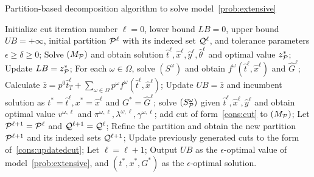 \documentclass[11pt]{article}
\newcommand{\cQ}{{\cal Q}}
\newcommand{\cP}{{\cal P}}
\newcommand{\tcr}{\textcolor{red}}
\begin{document}
	\begin{algorithm}[ht]
		\caption{Partition-based decomposition algorithm to solve model~\eqref{prob:extensive}}
		\label{alg:Cut}
		\begin{algorithmic}[1]
			\State Initialize cut iteration number \(\ell = 0\), lower bound \(LB = 0\), upper bound \(UB = +\infty\), initial partition \(\cP^\ell\) with its indexed set \(\cQ^\ell\), and tolerance parameters \( \epsilon \ge \delta \ge 0\);
			 \label{alg:while_step}
			\State Solve \((M_{\cP})\) and obtain solution \(\hat{t}^{\ell}, \hat{x}^{\ell}, \hat{y}^{\ell}, \hat{\theta}^{\ell}\) and optimal value \(z_{\cP}^*\);
			\If{\(z_{\cP}^* > LB\)}
			\State Update \(LB = z_{\cP}^*\);
			\EndIf
			\State For each \(\omega \in \Omega\), solve \((S^\omega)\) and obtain \(f^{\omega}(\hat{t}^{\ell},\hat{x}^{\ell})\) and \(\hat{G}^\ell\); 
			\State Calculate \(\bar{z} = p^0 \hat{t}^\ell_T + \sum_{\omega \in \Omega} p^\omega f^{\omega}(\hat{t}^\ell,\hat{x}^\ell)\); \label{alg:upper_bound_calculation} 
			\State Update \(UB =\bar{z}\) and incumbent solution as \(t^* = \hat{t}^\ell, x^* = \hat{x}^\ell\) and \(G^* = \hat{G}^\ell\);
			\EndIf
                \State solve \((S_{\cP}^\omega)\) given \(\hat{t}^{\ell}, \hat{x}^{\ell}, \hat{y}^{\ell}\) and obtain optimal value \(v^{\omega,\ell}\) and \(\pi^{\omega,\ell}, \lambda^{\omega,\ell}, \gamma^{\omega,\ell}\); \label{alg:step_to_solve_LP_sub}
                    add cut of form~\eqref{cons:cut} to \((M_{\cP})\);
                \EndIf
            \EndFor
			\State Let \(\cP^{\ell + 1} = \cP^\ell\) and \(\cQ^{\ell + 1} = \cQ^\ell\); 
			\Else
			\State Refine the partition and obtain the new partition \(\cP^{\ell + 1}\) and its indexed sets \(\cQ^{\ell + 1}\); \label{alg:refine_partition}
			\State Update previously generated cuts to the form of~\eqref{cons:updatedcut};
			\EndIf
			\State Let \(\ell = \ell + 1\);
			\vspace{0.1cm}
			\State Output \(UB\) as the $\epsilon$-optimal value of model~\eqref{prob:extensive}, and \((t^*, x^*, G^*)\) as the $\epsilon$-optimal solution.
		\end{algorithmic}
	\end{algorithm}
	
\end{document}
